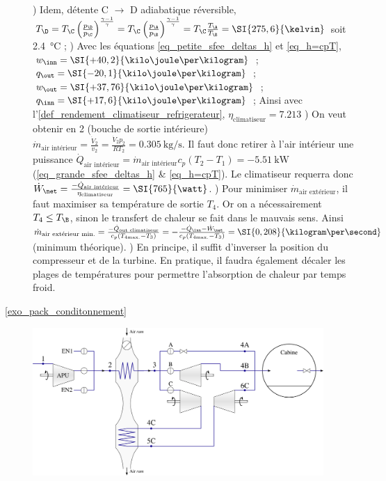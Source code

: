 \begin{description}
				) Idem, détente C $\to$ D adiabatique réversible, $T_\D = T_\C \left(\frac{p_\D}{p_\C}\right)^{\frac{\gamma - 1}{\gamma}} = T_\C \left(\frac{p_\A}{p_\B}\right)^{\frac{\gamma - 1}{\gamma}} = T_\C \frac{T_\A}{T_\B} = \SI{275,6}{\kelvin}$ soit \SI{2,4}{\degreeCelsius} ;
				) Avec les équations \ref{eq_petite_sfee_deltas_h} et \ref{eq_h=cpT}, $w_\inn = \SI{+40,2}{\kilo\joule\per\kilogram}$ ; 
						$q_\out = \SI{-20,1}{\kilo\joule\per\kilogram}$ ; 
						$w_\out = \SI{+37,76}{\kilo\joule\per\kilogram}$ ; 
						$q_\inn = \SI{+17,6}{\kilo\joule\per\kilogram}$ ; 
						Ainsi avec l’\cref{def_rendement_climatiseur_refrigerateur}, $\eta_\text{climatiseur} = \num{7,213}$
				) On veut obtenir en 2 (bouche de sortie intérieure) $\dot m_\text{air intérieur} = \frac{\dot V_2}{v_2} = \frac{\dot V_2 p_2}{R T_2} = \SI{0,305}{\kilogram\per\second}$. 
						Il faut donc retirer à l’air intérieur une puissance $\dot Q_\text{air intérieur} = \dot m_\text{air intérieur} c_p (T_2 - T_1) = \SI{-5,51}{\kilo\watt}$ (\ref{eq_grande_sfee_deltas_h} \& \ref{eq_h=cpT}).
						Le climatiseur requerra donc $\dot W_\net = \frac{-\dot Q_\text{air intérieur}}{\eta_\text{climatiseur}} = \SI{765}{\watt}$.
				) Pour minimiser $\dot m_\text{air extérieur}$, il faut maximiser sa température de sortie $T_4$. Or on a nécessairement $T_4 \leq T_\B$, sinon le transfert de chaleur se fait dans le mauvais sens. Ainsi $\dot m_\text{air extérieur min.} = \frac{-\dot Q_\text{out climatiseur}}{c_p (T_{4 \text{max.}} - T_3)} = -\frac{-\dot Q_\inn - \dot W_\net}{c_p (T_{4 \text{max.}} - T_3)} = \SI{0,208}{\kilogram\per\second}$ (minimum théorique).
				\tab{}) En principe, il suffit d’inverser la position du compresseur et de la turbine. En pratique, il faudra également décaler les plages de températures pour permettre l’absorption de chaleur par temps froid.
	\item[\ref{exo_pack_conditonnement}]
			\includegraphics[width=0.9\textwidth]{images/exo_sol_circuit_acm.png}\onlyamphibook{\\}

\end{description}
